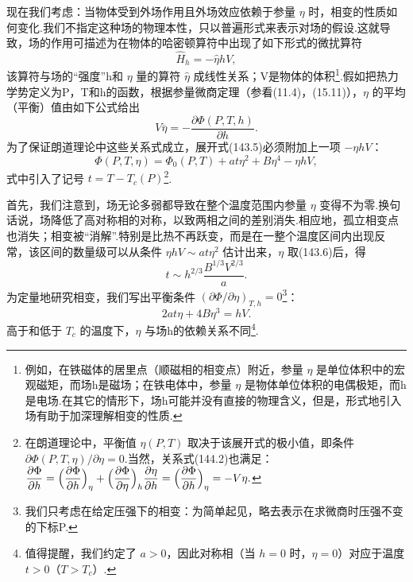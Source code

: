 现在我们考虑：当物体受到外场作用且外场效应依赖于参量 $\eta$ 时，相变的性质如何变化.我们不指定这种场的物理本性，只以普遍形式来表示对场的假设.这就导致，场的作用可描述为在物体的哈密顿算符中出现了如下形式的微扰算符
\begin{equation}
  \hat{H}_h=-\hat{\eta}hV,
\end{equation}
该算符与场的“强度”h和 $\eta$ 量的算符 $\hat{\eta}$ 成线性关系；V是物体的体积\footnote{例如，在铁磁体的居里点（顺磁相的相变点）附近，参量 $\eta$ 是单位体积中的宏观磁矩，而场h是磁场；在铁电体中，参量 $\eta$ 是物体单位体积的电偶极矩，而h是电场.在其它的情形下，场h可能并没有直接的物理含义，但是，形式地引入场有助于加深理解相变的性质.}.假如把热力学势定义为P，T和h的函数，根据参量微商定理（参看(11.4)，(15.11)），$\eta$ 的平均（平衡）值由如下公式给出
\begin{equation}
  V\overline{\eta}=-\frac{\partial\Phi(P,T,h)}{\partial h}.
\end{equation}
为了保证朗道理论中这些关系式成立，展开式(143.5)必须附加上一项 $-\eta hV$：
\begin{equation}
  \Phi(P,T,\eta)=\Phi_0(P,T)+at\eta^2+B\eta^4-\eta hV,
\end{equation}
式中引入了记号 $t=T-T_c(P)$\footnote{在朗道理论中，平衡值 $\eta(P,T)$ 取决于该展开式的极小值，即条件 $\partial\Phi(P,T,\eta)/\partial\eta=0$.当然，关系式(144.2)也满足：$\dfrac{\partial\Phi}{\partial h}=\Bigl(\dfrac{\partial\Phi}{\partial h}\Bigr)_{\eta}+\Bigl(\dfrac{\partial\Phi}{\partial\eta}\Bigr)_{h}\dfrac{\partial\eta}{\partial h}=\Bigl(\dfrac{\partial\Phi}{\partial h}\Bigr)_{\eta}=-V\eta.$}.

首先，我们注意到，场无论多弱都导致在整个温度范围内参量 $\eta$ 变得不为零.换句话说，场降低了高对称相的对称，以致两相之间的差别消失.相应地，孤立相变点也消失；相变被“消解”.特别是比热不再跃变，而是在一整个温度区间内出现反常，该区间的数量级可以从条件 $\eta hV\sim at\eta^2$ 估计出来，$\eta$ 取(143.6)后，得
\begin{equation*}
  t\sim h^{2/3}\frac{B^{1/3}V^{2/3}}{a}.
\end{equation*}
为定量地研究相变，我们写出平衡条件 $(\partial\Phi/\partial\eta)_{T,h}=0$\footnote{我们只考虑在给定压强下的相变：为简单起见，略去表示在求微商时压强不变的下标P.}：
\begin{equation}
  2at\eta+4B\eta^3=hV.
\end{equation}
高于和低于 $T_c$ 的温度下，$\eta$ 与场h的依赖关系不同\footnote{值得提醒，我们约定了 $a>0$，因此对称相（当 $h=0$ 时，$\eta=0$）对应于温度 $t>0$（$T>T_c$）.}.

